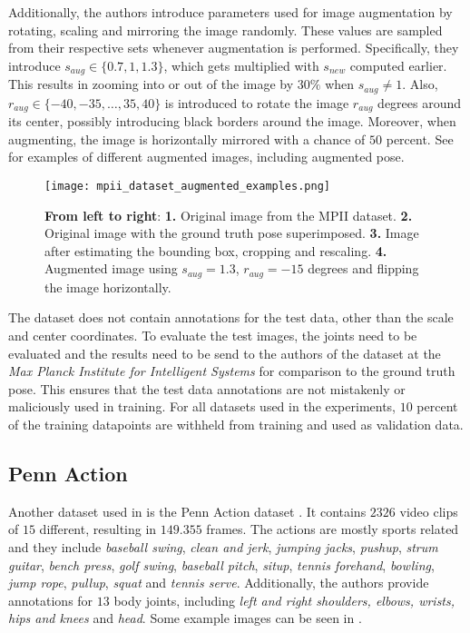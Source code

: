 Additionally, the authors introduce parameters used for image augmentation by rotating, scaling and mirroring the image randomly.
These values are sampled from their respective sets whenever augmentation is performed.
Specifically, they introduce $s_{aug} \in \{0.7, 1, 1.3\}$, which gets multiplied with $s_{new}$ computed earlier.
This results in zooming into or out of the image by $30\%$ when $s_{aug} \not= 1$. 
Also, $r_{aug} \in \{-40, -35, \dots, 35, 40\}$ is introduced to rotate the image $r_{aug}$ degrees around its center, possibly introducing black borders around the image.
Moreover, when augmenting, the image is horizontally mirrored with a chance of $50$ percent.
See  for examples of different augmented images, including augmented pose.

\begin{figure}[htb!]
    \centering
    \texttt{[image: mpii\_dataset\_augmented\_examples.png]}
    \caption{\textbf{From left to right}: \textbf{1.} Original image from the MPII dataset. \textbf{2.} Original image with the ground truth pose superimposed. \textbf{3.} Image after estimating the bounding box, cropping and rescaling. \textbf{4.} Augmented image using $s_{aug} = 1.3$, $r_{aug} = -15$ degrees and flipping the image horizontally.}
    \label{fig:mpii_example_augmentation}
\end{figure}


The dataset does not contain annotations for the test data, other than the scale and center coordinates.
To evaluate the test images, the joints need to be evaluated and the results need to be send to the authors of the dataset at the \textit{Max Planck Institute for Intelligent Systems} for comparison to the ground truth pose.
This ensures that the test data annotations are not mistakenly or maliciously used in training.
For all datasets used in the experiments, $10$ percent of the training datapoints are withheld from training and used as validation data.

\subsection{Penn Action}
\label{sec:exp-penn}

Another dataset used in \cite{luvizon_2d/3d_2018} is the Penn Action dataset \cite{zhang_actemes_2013}.
It contains $2326$ video clips of $15$ different, resulting in $149.355$ frames.
The actions are mostly sports related and they include \textit{baseball swing}, \textit{clean and jerk}, \textit{jumping jacks}, \textit{pushup}, \textit{strum guitar}, \textit{bench press}, \textit{golf swing}, \textit{baseball pitch}, \textit{situp}, \textit{tennis forehand}, \textit{bowling}, \textit{jump rope}, \textit{pullup}, \textit{squat} and \textit{tennis serve}.
Additionally, the authors provide annotations for $13$ body joints,
including \textit{left and right shoulders, elbows, wrists, hips and knees} and \textit{head}.
Some example images can be seen in . 

